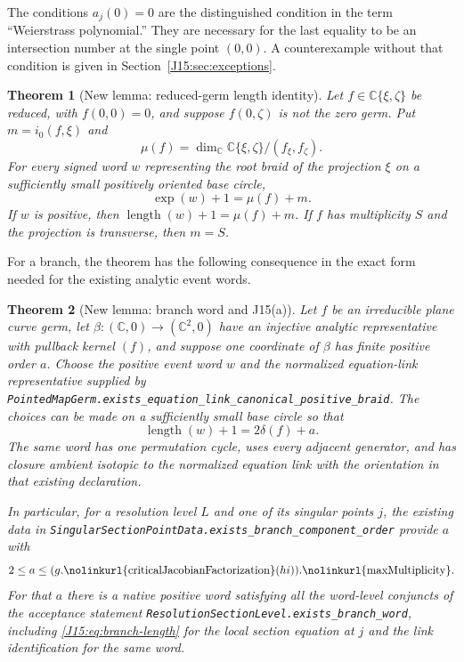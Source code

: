 \documentclass[11pt,oneside]{report}
\newtheorem{theorem}{Theorem}[section]
\theoremstyle{definition}
\numberwithin{equation}{section}
\newcommand{\C}{\mathbb C}
\newcommand{\decl}[1]{\textnormal{\nolinkurl{#1}}}
\newcommand{\Exp}{\operatorname{exp}}
\newcommand{\length}{\operatorname{length}}
\begin{document}
The conditions $a_j(0)=0$ are the distinguished condition in the term
``Weierstrass polynomial.'' They are necessary for the last equality to be
an intersection number at the single point $(0,0)$. A counterexample without
that condition is given in Section~\ref{J15:sec:exceptions}.

\begin{theorem}[New lemma: reduced-germ length identity]
\label{J15:thm:reduced}
Let $f\in\C\{\xi,\zeta\}$ be reduced, with $f(0,0)=0$, and suppose
$f(0,\zeta)$ is not the zero germ. Put $m=i_0(f,\xi)$ and
\[
 \mu(f)=\dim_\C\C\{\xi,\zeta\}/(f_\xi,f_\zeta).
\]
For every signed word $w$ representing the root braid of the projection
$\xi$ on a sufficiently small positively oriented base circle,
\begin{equation}\label{J15:eq:exp-polar}
 \Exp(w)+1=\mu(f)+m.
\end{equation}
If $w$ is positive, then $\length(w)+1=\mu(f)+m$.
If $f$ has multiplicity $S$ and the projection is transverse, then $m=S$.
\end{theorem}

For a branch, the theorem has the following consequence in the exact form
needed for the existing analytic event words.

\begin{theorem}[New lemma: branch word and J15(a)]
\label{J15:thm:branch}
Let $f$ be an irreducible plane curve germ, let
$\beta:(\C,0)\longrightarrow(\C^2,0)$ have an injective analytic
representative with pullback kernel $(f)$, and suppose one coordinate of
$\beta$ has finite positive order $a$. Choose the positive event word $w$
and the normalized equation-link representative supplied by
\decl{PointedMapGerm.exists_equation_link_canonical_positive_braid}.
The choices can be made on a sufficiently small base circle so that
\begin{equation}\label{J15:eq:branch-length}
 \length(w)+1=2\delta(f)+a.
\end{equation}
The same word has one permutation cycle, uses every adjacent generator,
and has closure ambient isotopic to the normalized equation link with the
orientation in that existing declaration.

In particular, for a resolution level $L$ and one of its singular points $j$,
the existing data in
\decl{SingularSectionPointData.exists_branch_component_order} provide
$a$ with
\[
 2\le a\le (g.\decl{criticalJacobianFactorization}(hi)).
                 \decl{maxMultiplicity}.
\]
For that $a$ there is a native positive word satisfying all the word-level
conjuncts of the acceptance statement
\decl{ResolutionSectionLevel.exists_branch_word}, including
\eqref{J15:eq:branch-length} for the local section equation at $j$ and the link
identification for the same word.
\end{theorem}
\end{document}
